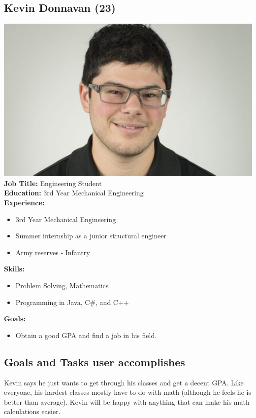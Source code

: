 \documentclass{article}
\begin{document}
\subsection*{Kevin Donnavan (23)}
\includegraphics[scale=0.15]{kevin.png}\\
\textbf{Job Title: }Engineering Student\\
\textbf{Education:} 3rd Year Mechanical Engineering\\
\textbf{Experience:}
\begin{itemize}
\itemsep0em 
\item 3rd Year Mechanical Engineering
\item Summer internship as a junior structural engineer
\item Army reserves - Infantry
\end{itemize}

\textbf{Skills:}
\begin{itemize}
\itemsep0em 
\item Problem Solving, Mathematics
\item Programming in Java, C\#, and C++
\end{itemize}

\textbf{Goals:}
\begin{itemize}
\itemsep0em 
\item Obtain a good GPA and find a job in his field.
\end{itemize}

\subsection*{Goals and Tasks user accomplishes}
Kevin says he just wants to get through his classes and get a decent GPA. Like everyone, his hardest classes mostly have to do with math (although he feels he is better than average). Kevin will be happy with anything that can make his math calculations easier. 
\end{document}

